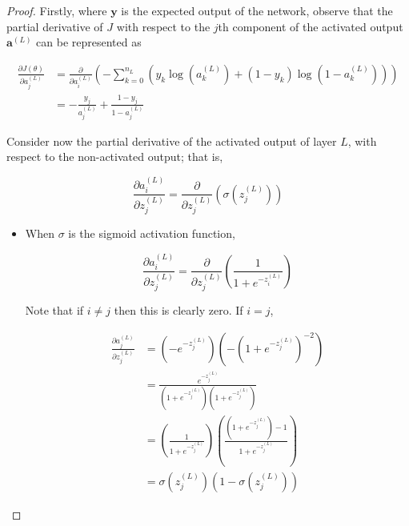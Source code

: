 \documentclass{article}
\begin{document}
        
        \begin{proof}
            
            Firstly, where $\mathbf{y}$ is the expected output of the network, observe that the partial derivative of $J$ with respect to the $j$th component of the activated output $\mathbf{a}^{(L)}$ can be represented as
                    
            $$ \begin{aligned}
            \frac{\partial J(\theta)}{\partial a^{(L)}_j}
            &= \frac{\partial}{\partial a^{(L)}_i} \left( - \sum_{k=0}^{n_L} \left( y_k \log(a^{(L)}_k) + (1 - y_k) \log(1 - a^{(L)}_k) \right) \right) \\
            &= - \frac{y_j}{a^{(L)}_j} + \frac{1 - y_j}{1 - a^{(L)}_j}
            \end{aligned} $$
            
            Consider now the partial derivative of the activated output of layer $L$, with respect to the non-activated output; that is,
            
            $$
            \frac{\partial a^{(L)}_i}{\partial z^{(L)}_j} = \frac{\partial}{\partial z^{(L)}_j} \left( \sigma(z^{(L)}_j) \right)
            $$
            
             
            \begin{itemize}
                
                \item When $\sigma$ is the sigmoid activation function,
            
                $$
                \frac{\partial a^{(L)}_i}{\partial z^{(L)}_j} = \frac{\partial}{\partial z^{(L)}_j} \left( \frac{1}{1 + e^{-z^{(L)}_i}} \right)
                $$
                
                Note that if $i \neq j$ then this is clearly zero. If $i = j$,
                
                $$ \begin{aligned}
                \frac{\partial a^{(L)}_j}{\partial z^{(L)}_j}
                &= \left( - e^{-z^{(L)}_j} \right) \left( - \left( 1 + e^{-z^{(L)}_j} \right)^{-2} \right) \\
                &= \frac{e^{-z^{(L)}_j}}{\left( 1 + e^{-z^{(L)}_j} \right) \left( 1 + e^{-z^{(L)}_j} \right)} \\
                &= \left( \frac{1}{1 + e^{-z^{(L)}_j}} \right) \left( \frac{\left( 1 + e^{-z^{(L)}_j} \right) - 1}{1 + e^{-z^{(L)}_j}} \right) \\
                &= \sigma(z^{(L)}_j) \left( 1 - \sigma(z^{(L)}_j) \right)
                \end{aligned} $$
                

\end{itemize}
\end{proof}
\end{document}
